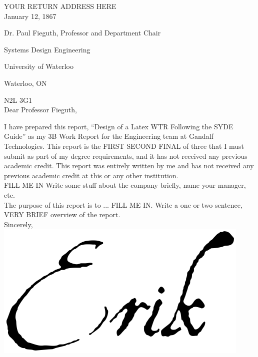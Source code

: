 \documentclass[12pt]{article}
\title{\reportTitle}
\author{\studentName}
\date{\reportDueDate}
\def\reportTitle{Design of a Latex WTR Following the SYDE Guide}
\def\reportDueDate{January 12, 1867}
\begin{document}
	\startindent
	\makewtrtitle

	\stopindent
    \begin{singlespace}

		YOUR RETURN ADDRESS HERE \\

    	\reportDueDate

		Dr. Paul Fieguth, Professor and Department Chair
	
		Systems Design Engineering
	
	    University of Waterloo
	
	    Waterloo, ON
	
	    N2L 3G1\\
	
		Dear Professor Fieguth,
	\end{singlespace}
    
        I have prepared this report, “\reportTitle” as my 3B Work Report for the Engineering team at Gandalf Technologies. This report is the FIRST SECOND FINAL of three that I must submit as part of my degree requirements, and it has not received any previous academic credit. This report was entirely written by me and has not received any previous academic credit at this or any other institution.\\
    	
    	FILL ME IN Write some stuff about the company briefly, name your manager, etc. \\
    	
    	The purpose of this report is to ... FILL ME IN. Write a one or two sentence, VERY BRIEF overview of the report. \\


	    \noindent
	    Sincerely,\\
	    \includegraphics[scale =0.2]{Signature}\\
    	
\end{document}
